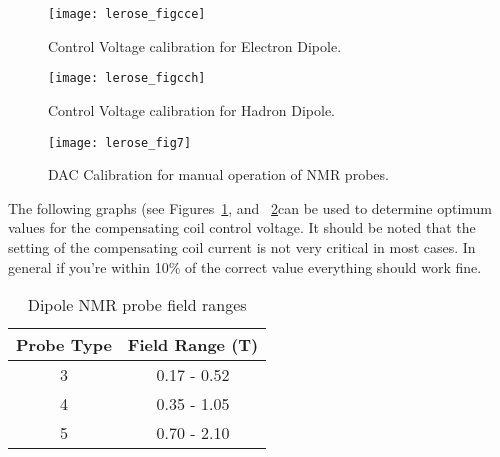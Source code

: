 
\begin{figure}
\begin{center}
\texttt{[image: lerose\_figcce]}
{\linespread{1.}
\caption[Spectrometers: Control Voltage Calibration for Electron Dipole]{Control Voltage calibration for Electron Dipole.}
\label{fig:nmrcomp4}}
\end{center}
\end{figure}

\begin{figure}
\begin{center}
\texttt{[image: lerose\_figcch]}
{\linespread{1.}
\caption[Spectrometers: Control Voltage Calibration for Hadron Dipole] {Control Voltage calibration for Hadron Dipole.}
\label{fig:nmrcomp5}}
\end{center}
\end{figure}

\begin{figure}
\begin{center}
\texttt{[image: lerose\_fig7]}
{\linespread{1.}
\caption[Spectrometers: NMR Probe DAC Calibration]{DAC Calibration for manual operation of NMR probes.}
\label{fig:nmr_dac}}
\end{center}
\end{figure}

The following graphs (see Figures~\ref{fig:nmrcomp4}, 
and ~\ref{fig:nmrcomp5}can be used to determine optimum values for the 
compensating coil control voltage.  It should be noted that the setting 
of the compensating coil current is not very critical in most cases.  In 
general if you're within 10\% of the correct value everything should 
work fine.



\begin{table}
\begin{center}
\caption[Spectrometers: Dipole NMR Probe Field Ranges]{Dipole NMR probe field ranges}
\label{nmr_range}
\begin{tabular}{|cc|} \hline
Probe Type & Field Range (T) \\ \hline 
3 & 0.17 - 0.52 \\
4 & 0.35 - 1.05 \\
5 & 0.70 - 2.10 \\ \hline
\end{tabular}
\end{center}
\end{table}

